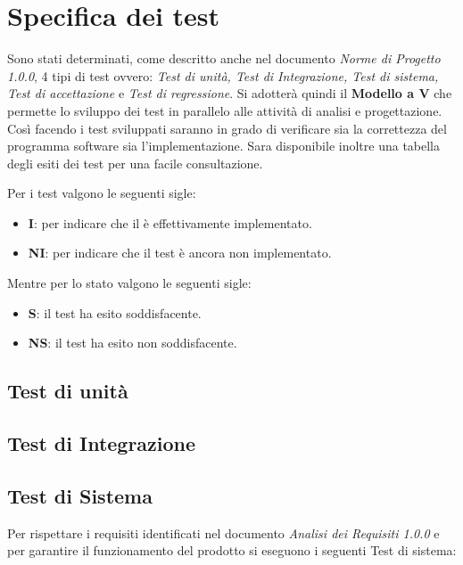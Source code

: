 \section{Specifica dei test}

Sono stati determinati, come descritto anche nel documento \textit{Norme di Progetto 1.0.0}, 4 tipi di test ovvero: \textit{Test di unità, Test di Integrazione, Test di sistema, Test di accettazione} e \textit{Test di regressione}. Si adotterà quindi il \textbf{Modello a V} che permette lo sviluppo dei test in parallelo alle attività di analisi e progettazione. Così facendo i test sviluppati saranno in grado di verificare sia la correttezza del programma software sia l'implementazione. Sara disponibile inoltre una tabella degli esiti dei test per una facile consultazione.

Per i test valgono le seguenti sigle:

    \begin{itemize}
        \item \textbf{I}: per indicare che il è effettivamente implementato.
        \item \textbf{NI}: per indicare che il test è ancora non implementato.
    \end{itemize}
    
Mentre per lo stato valgono le seguenti sigle:

    \begin{itemize}
        \item \textbf{S}: il test ha esito soddisfacente.
        \item \textbf{NS}: il test ha esito non soddisfacente.
    \end{itemize}
    
    
    \subsection{Test di unità}
    \subsection{Test di Integrazione}
    
    \subsection{Test di Sistema}
    
    Per rispettare i requisiti identificati nel documento \textit{Analisi dei Requisiti 1.0.0} e per garantire il funzionamento del prodotto si eseguono i seguenti Test di sistema:
    
